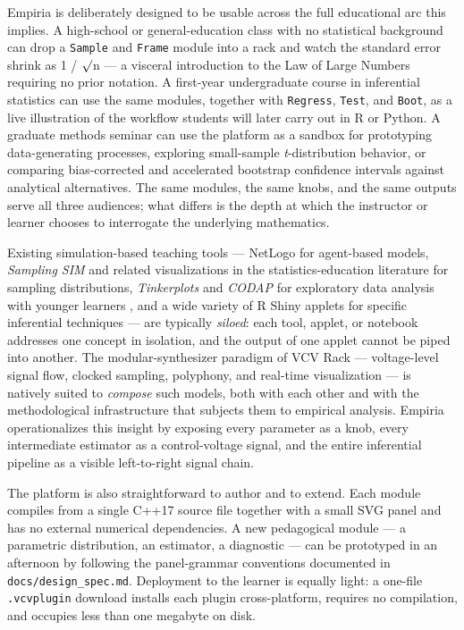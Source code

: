 Empiria is deliberately designed to be usable across the full
educational arc this implies. A high-school or general-education class
with no statistical background can drop a \texttt{Sample} and
\texttt{Frame} module into a rack and watch the standard error shrink as
1 / \ensuremath{\surd}n --- a visceral introduction to the Law of Large Numbers requiring
no prior notation. A first-year undergraduate course in inferential
statistics can use the same modules, together with \texttt{Regress},
\texttt{Test}, and \texttt{Boot}, as a live illustration of the workflow
students will later carry out in R or Python. A graduate methods seminar
can use the platform as a sandbox for prototyping data-generating
processes, exploring small-sample \emph{t}-distribution behavior, or
comparing bias-corrected and accelerated \citep{efron1987} bootstrap
confidence intervals against analytical alternatives. The same modules,
the same knobs, and the same outputs serve all three audiences; what
differs is the depth at which the instructor or learner chooses to
interrogate the underlying mathematics.

Existing simulation-based teaching tools --- NetLogo
\citep{wilensky1999} for agent-based models, \emph{Sampling SIM} and
related visualizations in the statistics-education literature
\citep{chance2004, delmas2007} for sampling distributions,
\emph{Tinkerplots} and \emph{CODAP} for exploratory data analysis with
younger learners \citep{konold2008, finzer2013}, and a wide variety of R
Shiny applets for specific inferential techniques --- are typically
\emph{siloed}: each tool, applet, or notebook addresses one concept in
isolation, and the output of one applet cannot be piped into another.
The modular-synthesizer paradigm of VCV Rack \citep{vcv-rack} ---
voltage-level signal flow, clocked sampling, polyphony, and real-time
visualization --- is natively suited to \emph{compose} such models, both
with each other and with the methodological infrastructure that subjects
them to empirical analysis. Empiria operationalizes this insight by
exposing every parameter as a knob, every intermediate estimator as a
control-voltage signal, and the entire inferential pipeline as a visible
left-to-right signal chain.

The platform is also straightforward to author and to extend. Each
module compiles from a single C++17 source file together with a small
SVG panel and has no external numerical dependencies. A new pedagogical
module --- a parametric distribution, an estimator, a diagnostic --- can
be prototyped in an afternoon by following the panel-grammar conventions
documented in \texttt{docs/design\_spec.md}. Deployment to the learner
is equally light: a one-file \texttt{.vcvplugin} download installs each
plugin cross-platform, requires no compilation, and occupies less than
one megabyte on disk.


